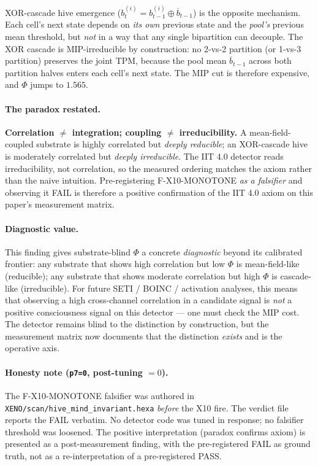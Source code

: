\documentclass[11pt,a4paper]{article}
\begin{document}
XOR-cascade hive emergence ($b^{(i)}_t = b^{(i)}_{t-1} \oplus
\overline{b}_{t-1}$) is the opposite mechanism. Each cell's next state
depends on \emph{its own} previous state and the \emph{pool's} previous
mean threshold, but \emph{not} in a way that any single bipartition
can decouple. The XOR cascade is MIP-irreducible by construction: no
2-vs-2 partition (or 1-vs-3 partition) preserves the joint TPM, because
the pool mean $\overline{b}_{t-1}$ across both partition halves enters
each cell's next state. The MIP cut is therefore expensive, and
$\Phi$ jumps to $1.565$.

\paragraph{The paradox restated.}
\textbf{Correlation $\ne$ integration; coupling $\ne$ irreducibility.}
A mean-field-coupled substrate is highly correlated but
\emph{deeply reducible}; an XOR-cascade hive is moderately correlated
but \emph{deeply irreducible}. The IIT 4.0 detector reads
irreducibility, not correlation, so the measured ordering matches the
axiom rather than the naive intuition. Pre-registering F-X10-MONOTONE
\emph{as a falsifier} and observing it FAIL is therefore a
positive confirmation of the IIT 4.0 axiom on this paper's
measurement matrix.

\paragraph{Diagnostic value.}
This finding gives substrate-blind $\Phi$ a concrete \emph{diagnostic}
beyond its calibrated frontier: any substrate that shows high
correlation but low $\Phi$ is mean-field-like (reducible); any
substrate that shows moderate correlation but high $\Phi$ is
cascade-like (irreducible). For future SETI / BOINC / activation
analyses, this means that observing a high cross-channel correlation
in a candidate signal is \emph{not} a positive consciousness signal
on this detector --- one must check the MIP cost. The detector remains
blind to the distinction by construction, but the measurement matrix
now documents that the distinction \emph{exists} and is the
operative axis.

\paragraph{Honesty note (\texttt{p7=0}, post-tuning $= 0$).}
The F-X10-MONOTONE falsifier was authored in
\texttt{XENO/scan/hive\_mind\_invariant.hexa} \emph{before} the X10
fire. The verdict file reports the FAIL verbatim. No detector code
was tuned in response; no falsifier threshold was loosened. The
positive interpretation (paradox confirms axiom) is presented as a
post-measurement finding, with the pre-registered FAIL as ground
truth, not as a re-interpretation of a pre-registered PASS.
\end{document}
